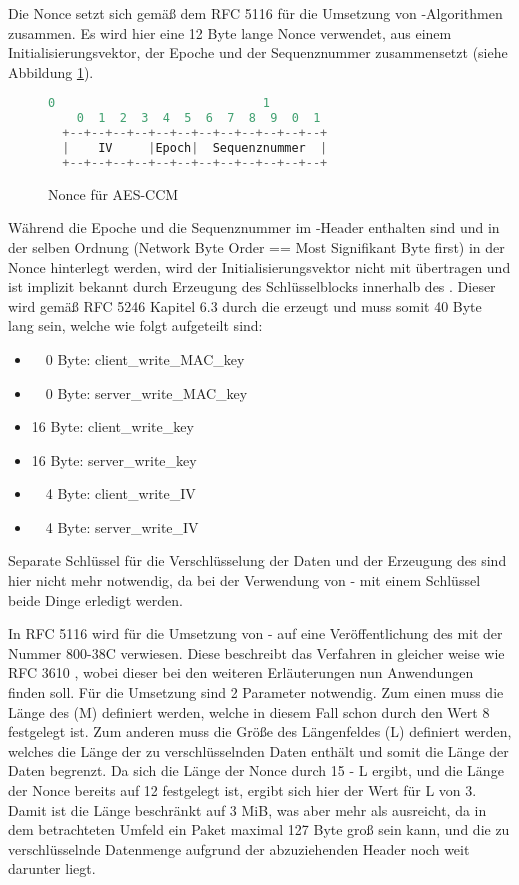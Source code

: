 Die Nonce setzt sich gemäß dem  RFC 5116 \cite{rfc5116} für die Umsetzung von -Algorithmen zusammen. Es wird hier eine 12 Byte lange
Nonce verwendet, aus einem Initialisierungsvektor, der Epoche und der Sequenznummer zusammensetzt (siehe Abbildung \ref{fig:aes_nonce}).
\begin{figure}[ht]
  \centering
  \begin{lstlisting}[language=c]
    0                             1
    0  1  2  3  4  5  6  7  8  9  0  1
  +--+--+--+--+--+--+--+--+--+--+--+--+
  |    IV     |Epoch|  Sequenznummer  |
  +--+--+--+--+--+--+--+--+--+--+--+--+
  \end{lstlisting}
  \caption{Nonce für AES-CCM}
  \label{fig:aes_nonce}
\end{figure}
Während die Epoche und die Sequenznummer im -Header enthalten sind und in der selben Ordnung (Network Byte Order == Most Signifikant
Byte first) in der Nonce hinterlegt werden, wird der Initialisierungsvektor nicht mit übertragen und ist implizit bekannt durch Erzeugung des
Schlüsselblocks innerhalb des . Dieser wird gemäß RFC 5246 \cite{rfc5246} Kapitel 6.3 durch die  erzeugt und muss somit
40 Byte lang sein, welche wie folgt aufgeteilt sind:
\begin{itemize}
  \item ~~0 Byte: client\_write\_MAC\_key
  \item ~~0 Byte: server\_write\_MAC\_key
  \item 16 Byte: client\_write\_key
  \item 16 Byte: server\_write\_key
  \item ~~4 Byte: client\_write\_IV
  \item ~~4 Byte: server\_write\_IV
\end{itemize}
Separate Schlüssel für die Verschlüsselung der Daten und der Erzeugung des  sind hier nicht mehr notwendig, da bei der Verwendung
von - mit einem Schlüssel beide Dinge erledigt werden.

In RFC 5116 \cite{rfc5116} wird für die Umsetzung von - auf eine Veröffentlichung des  mit der Nummer 800-38C \cite{nsp3610} verwiesen.
Diese beschreibt das Verfahren in gleicher weise wie RFC 3610 \cite{rfc3610}, wobei dieser bei den weiteren Erläuterungen nun Anwendungen finden soll.
Für die Umsetzung sind 2 Parameter notwendig. Zum einen muss die Länge des  (M) definiert werden, welche in diesem Fall schon durch den Wert 8 festgelegt
ist. Zum anderen muss die Größe des Längenfeldes (L) definiert werden, welches die Länge der zu verschlüsselnden Daten enthält und somit die Länge der Daten begrenzt.
Da sich die Länge der Nonce durch 15 - L ergibt, und die Länge der Nonce bereits auf 12 festgelegt ist, ergibt sich hier der Wert für L von 3. 
Damit ist die Länge beschränkt auf 3 MiB, was aber mehr als ausreicht, da in dem betrachteten Umfeld ein Paket maximal 127 Byte groß sein kann, und die zu
verschlüsselnde Datenmenge aufgrund der abzuziehenden Header noch weit darunter liegt.

